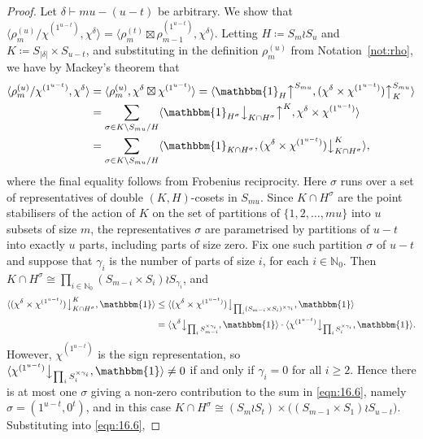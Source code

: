 \documentclass[ALCO, Unicode]{cedram}
\newcommand{\triv}{\mathbbm{1}}
\newcommand{\down}{\big\downarrow}
\newcommand{\up}{\big\uparrow}
\newcommand{\N}{\mathbb{N}}
\begin{document}
\begin{proof}
	Let $\delta\vdash mu-(u-t)$ be arbitrary. We show that $\langle \rho^{(u)}_m/\chi^{(1^{u-t})}, \chi^\delta\rangle = \langle\rho^{(t)}_m\boxtimes \rho^{(1^{u-t})}_{m-1}, \chi^\delta\rangle$. 
	Letting $H\coloneqq S_m\wr S_u$ and $K\coloneqq S_{|\delta|}\times S_{u-t}$, and substituting in the definition $\rho^{(u)}_m$ from Notation~\ref{not:rho}, we have by Mackey's theorem that
	\begin{align}\label{eqn:16.6}
		\langle \rho^{(u)}_m/\chi^{(1^{u-t})}, \chi^\delta\rangle &= \langle \rho^{(u)}_m, \chi^\delta\boxtimes\chi^{(1^{u-t})}\rangle = \langle \triv_H\up^{S_{mu}}, (\chi^\delta\times\chi^{(1^{u-t})})\up_K^{S_{mu}}\rangle \nonumber\\
		&= \sum_{\sigma\in K\setminus S_{mu}/H}\langle\triv_{H^\sigma}\down_{K\cap H^\sigma}\up^K,\chi^\delta\times\chi^{(1^{u-t})}\rangle\nonumber\\
		&=\sum_{\sigma\in K\setminus S_{mu}/H}\langle\triv_{K\cap H^\sigma},(\chi^\delta\times\chi^{(1^{u-t})})\down^K_{K\cap H^\sigma}\rangle,
	\end{align}
	where the final equality follows from Frobenius reciprocity.
	Here $\sigma$ runs over a set of representatives of double $(K,H)$-cosets in $S_{mu}$. Since $K\cap H^\sigma$ are the point stabilisers of the action of $K$ on the set of partitions of $\{1,2,\dotsc,mu\}$ into $u$ subsets of size $m$, the representatives $\sigma$ are parametrised by partitions of $u-t$ into exactly $u$ parts, including parts of size zero. 
	Fix one such partition $\sigma$ of $u-t$ and suppose that $\gamma_i$ is the number of parts of size $i$, for each $i\in\N_0$. Then $K\cap H^\sigma \cong \prod_{i\in\N_0} (S_{m-i}\times S_i)\wr S_{\gamma_i}$, and
	\begin{align*}
		\langle (\chi^\delta\times\chi^{(1^{u-t})})\down^K_{K\cap H^\sigma}, \triv\rangle &\le \langle (\chi^\delta\times\chi^{(1^{u-t})})\down_{\prod_i (S_{m-i}\times S_i)^{\times \gamma_i}}, \triv\rangle\\
		&= \langle \chi^\delta\down_{\prod_i S_{m-i}^{\times\gamma_i}},\triv\rangle\cdot \langle \chi^{(1^{u-t})}\down_{\prod_i S_i^{\times\gamma_i}},\triv\rangle.
	\end{align*}
	However, $\chi^{(1^{u-t})}$ is the sign representation, so $\langle \chi^{(1^{u-t})}\down_{\prod_i S_i^{\times\gamma_i}},\triv\rangle\ne 0$ if and only if $\gamma_i=0$ for all $i\ge 2$. Hence there is at most one $\sigma$ giving a non-zero contribution to the sum in \eqref{eqn:16.6}, namely $\sigma=(1^{u-t},0^t)$, and in this case $K\cap H^\sigma\cong (S_m\wr S_t)\times \big((S_{m-1}\times S_1)\wr S_{u-t}\big)$. Substituting into \eqref{eqn:16.6},

\end{proof}
\end{document}
